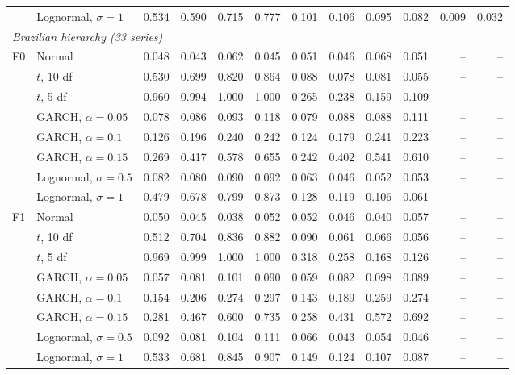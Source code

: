 \begin{tabular}{llrrrrrrrrrr}
 & Lognormal, $\sigma = 1$ & 0.534 & 0.590 & 0.715 & 0.777 & 0.101 & 0.106 & 0.095 & 0.082 & 0.009 & 0.032 \\
\multicolumn{12}{l}{\emph{Brazilian hierarchy (33 series)}} \\
F0 & Normal & 0.048 & 0.043 & 0.062 & 0.045 & 0.051 & 0.046 & 0.068 & 0.051 & -- & -- \\
 & $t$, 10 df & 0.530 & 0.699 & 0.820 & 0.864 & 0.088 & 0.078 & 0.081 & 0.055 & -- & -- \\
 & $t$, 5 df & 0.960 & 0.994 & 1.000 & 1.000 & 0.265 & 0.238 & 0.159 & 0.109 & -- & -- \\
 & GARCH, $\alpha = 0.05$ & 0.078 & 0.086 & 0.093 & 0.118 & 0.079 & 0.088 & 0.088 & 0.111 & -- & -- \\
 & GARCH, $\alpha = 0.1$ & 0.126 & 0.196 & 0.240 & 0.242 & 0.124 & 0.179 & 0.241 & 0.223 & -- & -- \\
 & GARCH, $\alpha = 0.15$ & 0.269 & 0.417 & 0.578 & 0.655 & 0.242 & 0.402 & 0.541 & 0.610 & -- & -- \\
 & Lognormal, $\sigma = 0.5$ & 0.082 & 0.080 & 0.090 & 0.092 & 0.063 & 0.046 & 0.052 & 0.053 & -- & -- \\
 & Lognormal, $\sigma = 1$ & 0.479 & 0.678 & 0.799 & 0.873 & 0.128 & 0.119 & 0.106 & 0.061 & -- & -- \\
F1 & Normal & 0.050 & 0.045 & 0.038 & 0.052 & 0.052 & 0.046 & 0.040 & 0.057 & -- & -- \\
 & $t$, 10 df & 0.512 & 0.704 & 0.836 & 0.882 & 0.090 & 0.061 & 0.066 & 0.056 & -- & -- \\
 & $t$, 5 df & 0.969 & 0.999 & 1.000 & 1.000 & 0.318 & 0.258 & 0.168 & 0.126 & -- & -- \\
 & GARCH, $\alpha = 0.05$ & 0.057 & 0.081 & 0.101 & 0.090 & 0.059 & 0.082 & 0.098 & 0.089 & -- & -- \\
 & GARCH, $\alpha = 0.1$ & 0.154 & 0.206 & 0.274 & 0.297 & 0.143 & 0.189 & 0.259 & 0.274 & -- & -- \\
 & GARCH, $\alpha = 0.15$ & 0.281 & 0.467 & 0.600 & 0.735 & 0.258 & 0.431 & 0.572 & 0.692 & -- & -- \\
 & Lognormal, $\sigma = 0.5$ & 0.092 & 0.081 & 0.104 & 0.111 & 0.066 & 0.043 & 0.054 & 0.046 & -- & -- \\
 & Lognormal, $\sigma = 1$ & 0.533 & 0.681 & 0.845 & 0.907 & 0.149 & 0.124 & 0.107 & 0.087 & -- & -- \\
\hline
\end{tabular}
